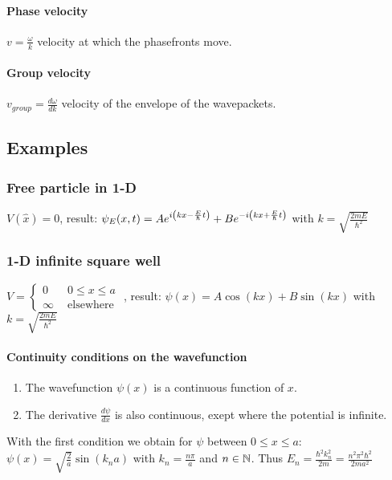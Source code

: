\paragraph{Phase velocity} $v = \frac{\omega}{k}$ velocity at which the phasefronts move.

\paragraph{Group velocity} $v_{group} = \frac{d \omega}{d k}$ velocity of the envelope
of the wavepackets.


\subsection{Examples}

\subsubsection{Free particle in 1-D}
$V(\hat{x}) = 0$, result: $\psi_E(x,t) = A e^{i\left( kx-\frac{E}{\hbar} t \right)} + B e^{-i \left( k x + \frac{E}{\hbar} t \right)}$
with $k = \sqrt{\frac{2 m E}{\hbar^2}}$

\subsubsection{1-D infinite square well}
$V = \begin{cases}
    0 \hspace{5pt} &0 \leq x \leq a
    \\
    \infty \hspace{5pt} &\text{elsewhere}
\end{cases}$
, result: $\psi(x) = A \cos(k x) + B \sin(k x)$ with $k = \sqrt{\frac{2 m E}{\hbar^2}}$

\paragraph{Continuity conditions on the wavefunction}
\begin{enumerate}
    \item The wavefunction $\psi(x)$ is a continuous function of $x$.
    \item The derivative $\frac{d \psi}{d x}$ is also continuous, exept where the
        potential is infinite.
\end{enumerate}
With the first condition we obtain for $\psi$ between $0 \leq x \leq a$:
$\psi(x) = \sqrt{\frac{2}{a}} \sin(k_n a)$ with $k_n = \frac{n \pi}{a}$ and
$n \in \mathbb{N}$. Thus $E_n = \frac{\hbar^2 k_n^2}{2m} = \frac{n^2 \pi^2 \hbar^2}{2 m a^2}$ 

